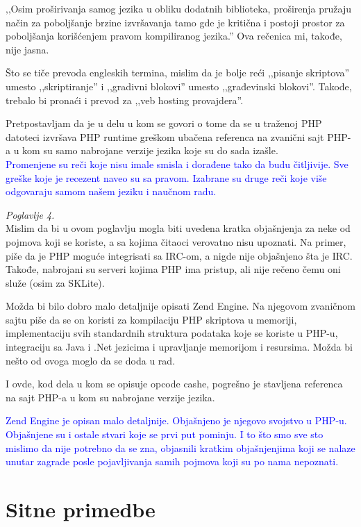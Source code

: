 \documentclass[a4paper]{report}
\newcommand{\odgovor}[1]{\textcolor{blue}{#1}}
\begin{document}
‚‚Osim proširivanja samog jezika u obliku dodatnih biblioteka, proširenja pružaju način za poboljšanje brzine izvršavanja tamo gde je kritična i postoji prostor za poboljšanja korišćenjem pravom kompiliranog jezika.'' Ova rečenica mi, takođe, nije jasna.

Što se tiče prevoda engleskih termina, mislim da je bolje reći ,,pisanje skriptova'' umesto ,,skriptiranje'' i ,,gradivni blokovi'' umesto ,,građevinski blokovi''. Takođe, trebalo bi pronaći i prevod za ,,veb hosting provajdera''.

Pretpostavljam da je u delu u kom se govori o tome da se u traženoj PHP datoteci izvršava PHP runtime greškom ubačena referenca na zvanični sajt PHP-a u kom su samo nabrojane verzije jezika koje su do sada izašle.\\
\odgovor{Promenjene su reči koje nisu imale smisla i dorađene tako da budu čitljivije. Sve greške koje je recezent naveo su sa pravom. Izabrane su druge reči koje više odgovaraju samom našem jeziku i naučnom radu.}

\textit{Poglavlje 4.}\\

Mislim da bi u ovom poglavlju mogla biti uvedena kratka objašnjenja za neke od pojmova koji se koriste, a sa kojima čitaoci verovatno nisu upoznati. Na primer, piše da je PHP moguće integrisati sa IRC-om, a nigde nije objašnjeno šta je IRC. Takođe, nabrojani su serveri kojima PHP ima pristup, ali nije rečeno čemu oni služe (osim za SKLite).

Možda bi bilo dobro malo detaljnije opisati Zend Engine. Na njegovom zvaničnom sajtu piše da se on koristi za kompilaciju PHP skriptova u memoriji, implementaciju svih standardnih struktura podataka koje se koriste u PHP-u, integraciju sa Java i .Net jezicima i upravljanje memorijom i resursima. Možda bi nešto od ovoga moglo da se doda u rad.

I ovde, kod dela u kom se opisuje opcode cashe, pogrešno je stavljena referenca na sajt PHP-a u kom su nabrojane verzije jezika.

\odgovor{Zend Engine je opisan malo detaljnije. Objašnjeno je njegovo svojstvo u PHP-u. Objašnjene su i ostale stvari koje se prvi put pominju. I to što smo sve sto mislimo da nije potrebno da se zna, objasnili kratkim objašnjenjima koji se nalaze unutar zagrade posle pojavljivanja samih pojmova koji su po nama nepoznati. }

\section{Sitne primedbe}
\end{document}
